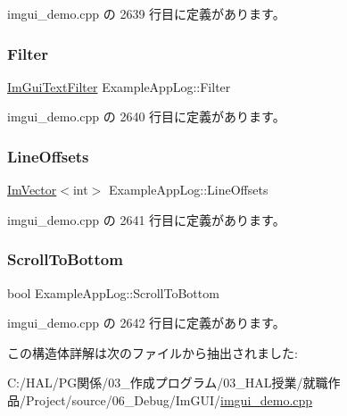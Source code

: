  imgui\+\_\+demo.\+cpp の 2639 行目に定義があります。

\mbox{\label{struct_example_app_log_a4571947a6000e984ec8da9b7166e1e2b}} 
\subsubsection{\texorpdfstring{Filter}{Filter}}
{\footnotesize\ttfamily \mbox{\hyperlink{struct_im_gui_text_filter}{Im\+Gui\+Text\+Filter}} Example\+App\+Log\+::\+Filter}



 imgui\+\_\+demo.\+cpp の 2640 行目に定義があります。

\mbox{\label{struct_example_app_log_af197fca7116f9033a5a5e831ee764ee2}} 
\subsubsection{\texorpdfstring{Line\+Offsets}{LineOffsets}}
{\footnotesize\ttfamily \mbox{\hyperlink{class_im_vector}{Im\+Vector}}$<$int$>$ Example\+App\+Log\+::\+Line\+Offsets}



 imgui\+\_\+demo.\+cpp の 2641 行目に定義があります。

\mbox{\label{struct_example_app_log_a6834b71563c0595e67b78afb6c7ce39d}} 
\subsubsection{\texorpdfstring{Scroll\+To\+Bottom}{ScrollToBottom}}
{\footnotesize\ttfamily bool Example\+App\+Log\+::\+Scroll\+To\+Bottom}



 imgui\+\_\+demo.\+cpp の 2642 行目に定義があります。



この構造体詳解は次のファイルから抽出されました\+:\begin{DoxyCompactItemize}
\item 
C\+:/\+H\+A\+L/\+P\+G関係/03\+\_\+作成プログラム/03\+\_\+\+H\+A\+L授業/就職作品/\+Project/source/06\+\_\+\+Debug/\+Im\+G\+U\+I/\mbox{\hyperlink{imgui__demo_8cpp}{imgui\+\_\+demo.\+cpp}}\end{DoxyCompactItemize}
